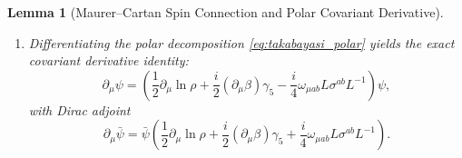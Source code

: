 \documentclass[11pt, a4paper]{article}
\newtheorem{lemma}[theorem]{Lemma}
\theoremstyle{definition}
\begin{document}
\begin{lemma}[Maurer--Cartan Spin Connection and Polar Covariant Derivative]
\begin{enumerate}[label=(\roman*)]
    \item Differentiating the polar decomposition \eqref{eq:takabayasi_polar} yields the exact covariant derivative identity:
    \begin{equation}
    \label{eq:d_psi_polar_main}
    \partial_\mu \psi = \left( \frac{1}{2}\partial_\mu \ln\rho + \frac{i}{2}(\partial_\mu \beta)\gamma_5 - \frac{i}{4}\omega_{\mu ab} L \sigma^{ab} L^{-1} \right) \psi,
    \end{equation}
    with Dirac adjoint
    \begin{equation}
    \label{eq:d_psibar_polar_main}
    \partial_\mu \bar{\psi} = \bar{\psi} \left( \frac{1}{2}\partial_\mu \ln\rho + \frac{i}{2}(\partial_\mu \beta)\gamma_5 + \frac{i}{4}\omega_{\mu ab} L \sigma^{ab} L^{-1} \right).
    \end{equation}
\end{enumerate}
\end{lemma}
\end{document}
